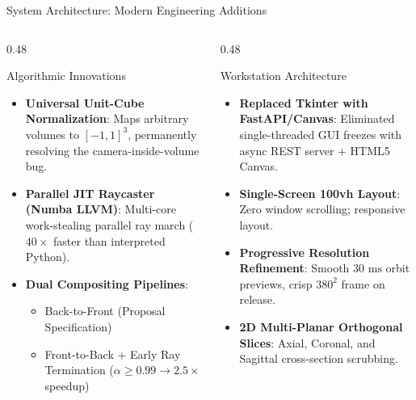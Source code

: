 \documentclass[aspectratio=169,11pt]{beamer}
\begin{document}
\begin{frame}{System Architecture: Modern Engineering Additions}
  \begin{columns}[T]
    \begin{column}{0.48\textwidth}
      \begin{block}{Algorithmic Innovations}
        \begin{itemize}
          \item \textbf{Universal Unit-Cube Normalization}:
            Maps arbitrary volumes to $[-1, 1]^3$, permanently resolving the camera-inside-volume bug.
          \item \textbf{Parallel JIT Raycaster (Numba LLVM)}:
            Multi-core work-stealing parallel ray march ($40\times$ faster than interpreted Python).
          \item \textbf{Dual Compositing Pipelines}:
            \begin{itemize}
              \item Back-to-Front (Proposal Specification)
              \item Front-to-Back + Early Ray Termination ($\alpha \ge 0.99 \rightarrow 2.5\times$ speedup)
            \end{itemize}
        \end{itemize}
      \end{block}
    \end{column}

    \begin{column}{0.48\textwidth}
      \begin{block}{Workstation Architecture}
        \begin{itemize}
          \item \textbf{Replaced Tkinter with FastAPI/Canvas}:
            Eliminated single-threaded GUI freezes with async REST server + HTML5 Canvas.
          \item \textbf{Single-Screen 100vh Layout}:
            Zero window scrolling; responsive layout.
          \item \textbf{Progressive Resolution Refinement}:
            Smooth $30\text{ ms}$ orbit previews, crisp $380^2$ frame on release.
          \item \textbf{2D Multi-Planar Orthogonal Slices}:
            Axial, Coronal, and Sagittal cross-section scrubbing.
        \end{itemize}
      \end{block}
    \end{column}
  \end{columns}
\end{frame}
\end{document}
